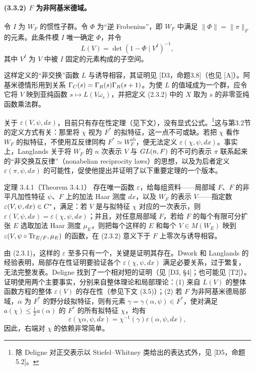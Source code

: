 \paragraph*{(3.3.2) $F$ 为非阿基米德域。}
令 $I$ 为 $W_F$ 的惯性子群。令 $\Phi$ 为“逆 Frobenius”，即 $W_F$ 中满足 $\lVert\Phi\rVert=\lVert\pi\rVert_F$ 的元素。此条件模 $I$ 唯一确定 $\Phi$，并令
\[
 L(V)=\det(1-\Phi\mid V^I)^{-1},
\]
其中 $V^I$ 为 $V$ 中被 $I$ 固定的元素构成的子空间。

这样定义的“非交换”函数 $L$ 与诱导相容，其证明见 [D3，命题3.8]（也见 [A]）。阿基米德情形用到关系 $\Gamma_{C}(s)=\Gamma_{R}(s)\Gamma_{R}(s+1)$。为使 $L$ 的值域成为一个群，应令它将 $V$ 映到亚纯函数 $s\mapsto L(V\omega_s)$，并把定义 (2.3.2) 中的 $X$ 取为 $s$ 的非零亚纯函数乘法群。

关于 $\varepsilon(V,\psi,dx)$，目前只有存在性定理（见下文），没有显式公式。\footnote{除 Deligne 对正交表示以 Stiefel--Whitney 类给出的表达式外，见 [D5，命题5.2]。}这与第3.2节的定义方式有关：那里将 $\chi$ 视为 $F^*$ 的拟特征，这一点不可或缺。若把 $\chi$ 看作 $W_F$ 的拟特征，不使用互反律同构 $F^*\simeq W_F^{\mathrm{ab}}$，便无法定义 $\varepsilon(\chi,\psi,dx)$。事实上，Langlands 关于将 $W_F$ 的 $n$ 次表示 $V$ 与 $GL(n,F)$ 的不可约表示 $\pi$ 联系起来的“非交换互反律”（nonabelian reciprocity laws）的思想，以及为后者定义 $\varepsilon(\pi,\psi,dx)$ 的可能性，促使他提出并证明了以下重要定理的一个版本。

\begin{originaltheorem}{定理 3.4.1（Theorem 3.4.1）}
存在唯一函数 $\varepsilon$，给每组资料——局部域 $F$、$F$ 的非平凡加性特征 $\psi$、$F$ 上的加法 Haar 测度 $dx$，以及 $W_F$ 的表示 $V$——指定数 $\varepsilon(V,\psi,dx)\in C^*$，满足：若 $V$ 是与拟特征 $\chi$ 对应的一次表示，则 $\varepsilon(V,\psi,dx)=\varepsilon(\chi,\psi,dx)$；并且，对任意局部域 $F$，若给 $F$ 的每个有限可分扩张 $E$ 选取加法 Haar 测度 $\mu_E$，则把每个这样的 $E$ 和每个 $V\in M(W_E)$ 映到 $\varepsilon(V,\psi\circ\operatorname{Tr}_{E/F},\mu_E)$ 的函数，在 (2.3.2) 意义下于 $F$ 上零次与诱导相容。
\end{originaltheorem}
由 (2.3.1)，这样的 $\varepsilon$ 至多只有一个，关键是证明其存在。Dwork 和 Langlands 的经验表明，局部存在性证明要验证各个 $\varepsilon(\chi,\psi,dx)$ 满足必要关系，过于繁复，无法完整发表。Deligne 找到了一个相对短的证明（见 [D3, §4]；也可能见 [T2]）。证明使用两个主要事实，分别来自整体理论和局部理论：(1) 来自 $L(V)$ 的整体函数方程的整体 $\varepsilon(V)$ 的存在性（参见下文 (3.5)）；(2) 若 $F$ 为非阿基米德局部域，$\alpha$ 为 $F^*$ 的野分歧拟特征，则有元素 $\gamma=\gamma(\alpha,\psi)\in F^*$，使对满足 $a(\chi)\leq\tfrac12a(\alpha)$ 的 $F^*$ 的所有拟特征 $\chi$，均有
\[
 \varepsilon(\chi\alpha,\psi,dx)=\chi^{-1}(\gamma)\varepsilon(\alpha,\psi,dx),
\]
因此，右端对 $\chi$ 的依赖非常简单。


